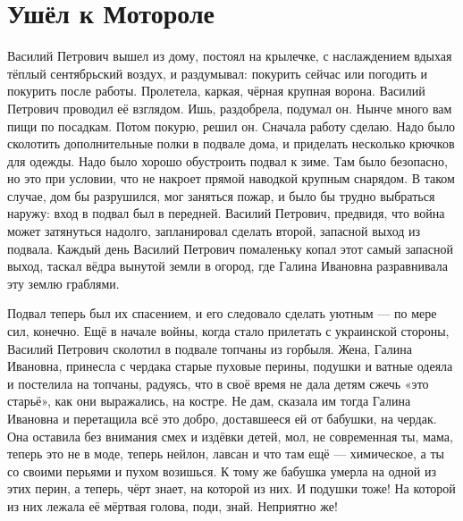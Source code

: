  
 
 
 
 

\section{Ушёл к Мотороле}
\label{sec:proza.rus.lavrova_elena.1.ushel_k_motorole}


Василий Петрович вышел из дому, постоял на крылечке, с наслаждением вдыхая
тёплый сентябрьский воздух, и раздумывал: покурить сейчас или погодить и
покурить после работы. Пролетела, каркая, чёрная крупная ворона. Василий
Петрович проводил её взглядом. Ишь, раздобрела, подумал он. Нынче много вам
пищи по посадкам. Потом покурю, решил он. Сначала работу сделаю. Надо было
сколотить дополнительные полки в подвале дома, и приделать несколько крючков
для одежды. Надо было хорошо обустроить подвал к зиме.  Там было безопасно, но
это при условии, что не накроет прямой наводкой крупным снарядом. В таком
случае, дом бы разрушился, мог заняться пожар, и было бы трудно выбраться
наружу: вход в подвал был в передней. Василий Петрович, предвидя, что война
может затянуться надолго, запланировал сделать второй, запасной выход из
подвала. Каждый день Василий Петрович помаленьку копал этот самый запасной
выход, таскал вёдра вынутой земли в огород, где Галина Ивановна разравнивала
эту землю граблями.

Подвал теперь был их спасением, и его следовало сделать уютным --- по мере сил,
конечно. Ещё в начале войны, когда стало прилетать с украинской стороны,
Василий Петрович сколотил в подвале топчаны из горбыля. Жена, Галина Ивановна,
принесла с чердака старые пуховые перины, подушки  и ватные одеяла и постелила
на топчаны, радуясь, что в своё время не дала детям сжечь «это старьё», как они
выражались, на костре. Не дам, сказала им тогда Галина Ивановна и перетащила
всё это добро, доставшееся ей от бабушки, на чердак. Она оставила без внимания
смех и издёвки детей, мол, не современная ты, мама, теперь это не в моде,
теперь нейлон, лавсан и что там ещё --- химическое, а ты со своими перьями и
пухом возишься. К тому же бабушка умерла на одной из этих перин, а теперь, чёрт
знает, на которой из них. И подушки тоже! На которой из них лежала её мёртвая
голова, поди, знай. Неприятно же!

